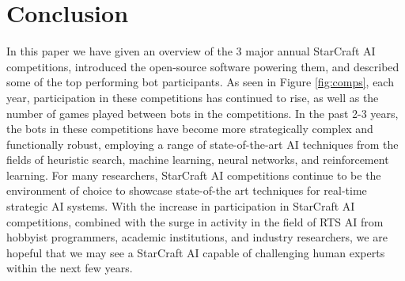 \vspace{1cm}
\section{Conclusion}\label{secConclusion}

In this paper we have given an overview of the 3 major annual StarCraft AI competitions, introduced the open-source software powering them, and described some of the top performing bot participants. As seen in Figure \ref{fig:comps}, each year, participation in these competitions has continued to rise, as well as the number of games played between bots in the competitions. In the past 2-3 years, the bots in these competitions have become more strategically complex and functionally robust, employing a range of state-of-the-art AI techniques from the fields of heuristic search, machine learning, neural networks, and reinforcement learning. For many researchers, StarCraft AI competitions continue to be the environment of choice to showcase state-of-the art techniques for real-time strategic AI systems. With the increase in participation in StarCraft AI competitions, combined with the surge in activity in the field of RTS AI from hobbyist programmers, academic institutions, and industry researchers, we are hopeful that we may see a StarCraft AI capable of challenging human experts within the next few years.

